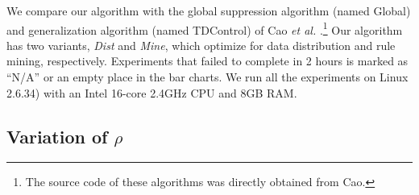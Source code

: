 We compare our algorithm with the
global suppression algorithm (named Global) and generalization algorithm 
(named TDControl) of
Cao {\em et al.} \cite{Cao:2010:rho}.\footnote{The source code of these
algorithms was directly obtained from Cao.} 
Our algorithm has two variants, {\em Dist} and {\em Mine}, which optimize
for data distribution and rule mining, respectively.
Experiments that failed to complete in 2 hours is marked
as ``N/A'' or an empty place in the bar charts.
We run all the experiments on Linux 2.6.34)
with an Intel 16-core 2.4GHz CPU and 8GB RAM. 

\subsection{Variation of $\rho$}

